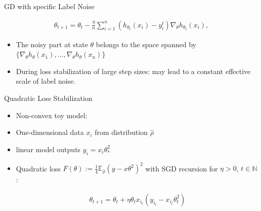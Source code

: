 \documentclass[fleqn]{beamer}
\begin{document}
    \begin{frame}{GD with specific Label Noise}
        \begin{center}
        \begin{minipage}{0.5\textwidth}
            \begin{align*}
                \theta_{t+1} = \theta_t - \frac{\eta}{n} \sum_{i=1}^{n}
                \left( h_{\theta_t}(x_i) - y_i^{t} \right)
                \nabla_{\theta} h_{\theta_t}(x_i),
            \end{align*}
        \end{minipage}
        \end{center}
        \begin{itemize}
            \item The noisy part at state $\theta$ belongs to the space
                spanned by $\{\nabla_\theta
                h_\theta(x_1),\ldots,\nabla_\theta h_\theta(x_n)\} $
            \item During loss stabilization of large step sizes: may lead to
                a constant effective scale of label noise.
        \end{itemize}
    \end{frame}

    \begin{frame}{Quadratic Loss Stabilization}
        \begin{itemize}
            \item Non-convex toy model:
            \item One-dimensional data $x_i$ from distribution $\hat{\rho}$
            \item linear model outputs $y_i = x_i \theta_*^{2}$
            \item Quadratic loss $F(\theta) :=
                \frac{1}{4}\mathbb{E}_{\hat{\rho}}(y-x\theta^{2})^{2}$ with
                SGD recursion for $\eta > 0$, $t \in \mathbb{N}$:
        \begin{center}
        \begin{minipage}{0.5\textwidth}
            \begin{align*}
                \theta_{t+1} = \theta_t + \eta \theta_t x_{i_t}(y_{i_t} -
                x_{i_t}\theta^{2}_t)
            \end{align*}
        \end{minipage}
        \end{center}


        \end{itemize}

    \end{frame}
\end{document}
